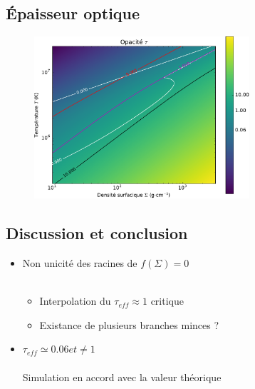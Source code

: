 \subsection*{Épaisseur optique}
\begin{frame}

   \begin{figure}[htb!]
      \includegraphics[width=8cm]{figures/tau_map.pdf}
   \end{figure}
\end{frame}




\subsection*{Discussion et conclusion}
\begin{frame}

   \begin{itemize}
      \item Non unicité des racines de $f(\Sigma) = 0$
      \\~\\
         \begin{itemize}
            \item Interpolation du $\tau_{eff} \approx 1$ critique
            \item Existance de plusieurs branches minces ? 
         \end{itemize}  
      \item $\tau_{eff} \simeq 0.06 et \neq 1$ 
      \\~\\
Simulation en accord avec la valeur théorique
   \end{itemize}
\end{frame}

